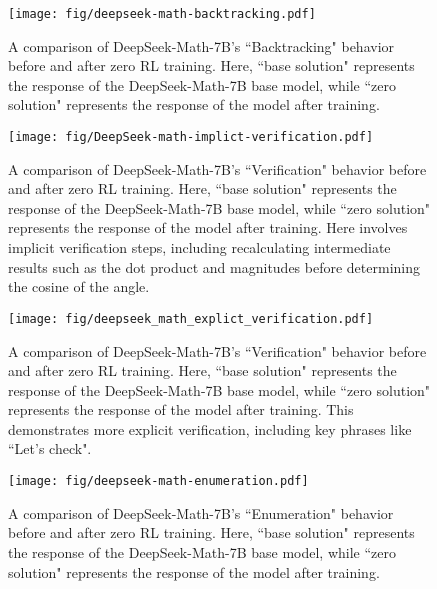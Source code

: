 \begin{figure}[!t]
        \centering
\texttt{[image: fig/deepseek-math-backtracking.pdf]}
\caption{A comparison of DeepSeek-Math-7B’s ``Backtracking" behavior before and after zero RL training. Here, ``base solution" represents the response of the DeepSeek-Math-7B base model,
while ``zero solution" represents the response of the model after training.}
        \label{fig:deepseekmath_backtracking.png}
\end{figure}

\begin{figure}[!t]
        \centering
\texttt{[image: fig/DeepSeek-math-implict-verification.pdf]}
\caption{A comparison of DeepSeek-Math-7B’s ``Verification" behavior before and after zero RL training. Here, ``base solution" represents the response of the DeepSeek-Math-7B base model,
while ``zero solution" represents the response of the model after training. Here involves implicit verification steps, including recalculating intermediate results such as the dot product and magnitudes before determining the cosine of the angle.}
        \label{fig:deepseekmath_base_verification}
\end{figure}



\begin{figure}[!t]
        \centering
\texttt{[image: fig/deepseek\_math\_explict\_verification.pdf]}
\caption{A comparison of DeepSeek-Math-7B’s ``Verification" behavior before and after zero RL training. Here, ``base solution" represents the response of the DeepSeek-Math-7B base model,
while ``zero solution" represents the response of the model after training. This demonstrates more explicit verification, including key phrases like ``Let's check".}
        \label{fig:deepseekmath_explict_verification}
\end{figure}



\begin{figure}[!t]
        \centering
\texttt{[image: fig/deepseek-math-enumeration.pdf]}
\caption{A comparison of DeepSeek-Math-7B’s ``Enumeration" behavior before and after zero RL training. Here, ``base solution" represents the response of the DeepSeek-Math-7B base model,
while ``zero solution" represents the response of the model after training.}
        \label{fig:deepseekmath_base_enumeration}
\end{figure}


